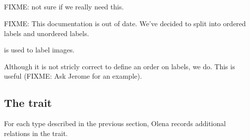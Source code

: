 \subsection{}

FIXME: not sure if we really need this.

FIXME: This documentation is out of date.  We've decided to split
 into ordered labels and unordered labels.

 is used to label images.

Although it is not stricly correct to define an order on labels,
we do.  This is useful (FIXME: Ask Jerome for an example).

\subsection{The  trait}

For each type  described in the previous section, Olena
records additional relations in the  trait.

